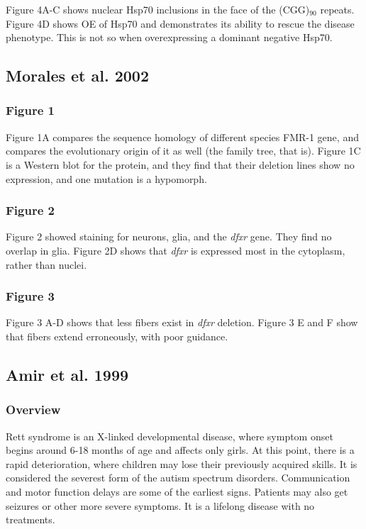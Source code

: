 \documentclass[12pt]{report}
\begin{document}
Figure 4A-C shows nuclear Hsp70 inclusions in the face of the (CGG)$_{90}$ repeats. Figure 4D shows OE of Hsp70 and demonstrates its ability to rescue the disease phenotype. This is not so when overexpressing a dominant negative Hsp70.

\subsection{Morales et al. 2002}

\subsubsection{Figure 1}

Figure 1A compares the sequence homology of different species FMR-1 gene, and compares the evolutionary origin of it as well (the family tree, that is). Figure 1C is a Western blot for the protein, and they find that their deletion lines show no expression, and one mutation is a hypomorph. 

\subsubsection{Figure 2}

Figure 2 showed staining for neurons, glia, and the \textit{dfxr} gene. They find no overlap in glia. Figure 2D shows that \textit{dfxr} is expressed most in the cytoplasm, rather than nuclei. 

\subsubsection{Figure 3}

Figure 3 A-D shows that less fibers exist in \textit{dfxr} deletion. Figure 3 E and F show that fibers extend erroneously, with poor guidance. 


\subsection{Amir et al. 1999}

\subsubsection{Overview}

Rett syndrome is an X-linked developmental disease, where symptom onset begins around 6-18 months of age and affects only girls. At this point, there is a rapid deterioration, where children may lose their previously acquired skills. It is considered the severest form of the autism spectrum disorders. Communication and motor function delays are some of the earliest signs. Patients may also get seizures or other more severe symptoms. It is a lifelong disease with no treatments.\newline
\end{document}
